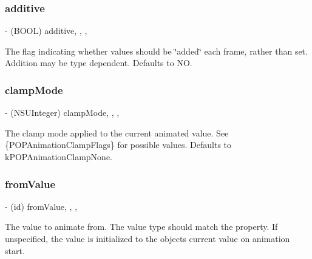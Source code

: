 \subsubsection{\texorpdfstring{additive}{additive}}
{\footnotesize\ttfamily -\/ (B\+O\+OL) additive\hspace{0.3cm}{\ttfamily [read]}, {\ttfamily [write]}, {\ttfamily [nonatomic]}, {\ttfamily [assign]}}

The flag indicating whether values should be \char`\"{}added\char`\"{} each frame, rather than set.  Addition may be type dependent. Defaults to NO. \mbox{\label{interface_p_o_p_property_animation_a24deb27bdfe50717e78dd4b45a14c34f}} 
\subsubsection{\texorpdfstring{clamp\+Mode}{clampMode}}
{\footnotesize\ttfamily -\/ (N\+S\+U\+Integer) clamp\+Mode\hspace{0.3cm}{\ttfamily [read]}, {\ttfamily [write]}, {\ttfamily [nonatomic]}, {\ttfamily [assign]}}

The clamp mode applied to the current animated value.  See \{P\+O\+P\+Animation\+Clamp\+Flags\} for possible values. Defaults to k\+P\+O\+P\+Animation\+Clamp\+None. \mbox{\label{interface_p_o_p_property_animation_aeb388bcf2599e1325982f3a76b153b9d}} 
\subsubsection{\texorpdfstring{from\+Value}{fromValue}}
{\footnotesize\ttfamily -\/ (id) from\+Value\hspace{0.3cm}{\ttfamily [read]}, {\ttfamily [write]}, {\ttfamily [nonatomic]}, {\ttfamily [copy]}}

The value to animate from.  The value type should match the property. If unspecified, the value is initialized to the object\textquotesingle{}s current value on animation start. \mbox{\label{interface_p_o_p_property_animation_a84277734179328f03be50a362f493082}} 
